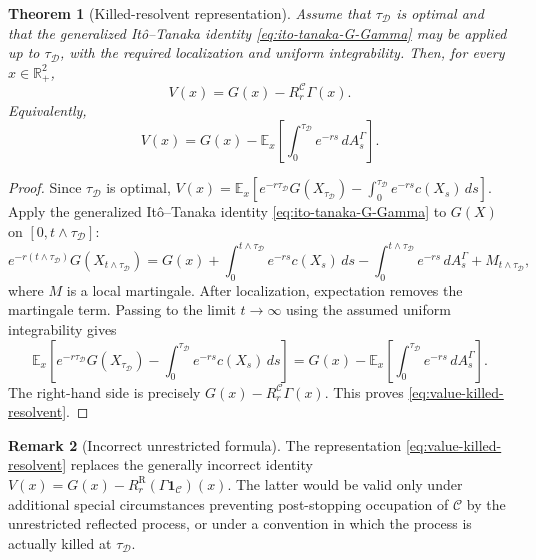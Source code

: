 \documentclass[pdflatex,sn-mathphys-num]{sn-jnl}
\theoremstyle{plain}
\newtheorem{theorem}{Theorem}[section]
\theoremstyle{definition}
\newtheorem{remark}[theorem]{Remark}
\newcommand{\R}{\mathbb{R}}
\begin{document}
\begin{theorem}[Killed-resolvent representation]
\label{thm:killed-resolvent-representation}
Assume that $\tau_{\mathcal D}$ is optimal and that the generalized
It\^o--Tanaka identity \eqref{eq:ito-tanaka-G-Gamma} may be applied up to
$\tau_{\mathcal D}$, with the required localization and uniform integrability.
Then, for every $x\in\R^2_+$,
\begin{equation}
\label{eq:value-killed-resolvent}
   V(x)=G(x)-R_r^{\mathcal C}\Gamma(x).
\end{equation}
Equivalently,
\[
   V(x)
   =
   G(x)
   -\mathbb E_x\left[
      \int_0^{\tau_{\mathcal D}}e^{-rs}\,dA_s^\Gamma
   \right].
\]
\end{theorem}
\begin{proof}
Since $\tau_{\mathcal D}$ is optimal,
$\displaystyle    V(x)
   =
   \mathbb E_x\left[
      e^{-r\tau_{\mathcal D}}G(X_{\tau_{\mathcal D}})
      -\int_0^{\tau_{\mathcal D}}e^{-rs}c(X_s)\,ds
   \right]$.
Apply the generalized It\^o--Tanaka identity \eqref{eq:ito-tanaka-G-Gamma} to
$G(X)$ on $[0,t\wedge\tau_{\mathcal D}]$:
\[
   e^{-r(t\wedge\tau_{\mathcal D})}G(X_{t\wedge\tau_{\mathcal D}})
   =
   G(x)
   +\int_0^{t\wedge\tau_{\mathcal D}}e^{-rs}c(X_s)\,ds
   -\int_0^{t\wedge\tau_{\mathcal D}}e^{-rs}\,dA_s^\Gamma
   +M_{t\wedge\tau_{\mathcal D}},
\]
where $M$ is a local martingale. After localization, expectation removes the
martingale term. Passing to the limit $t\to\infty$ using the assumed uniform
integrability gives
\[
   \mathbb E_x\left[
      e^{-r\tau_{\mathcal D}}G(X_{\tau_{\mathcal D}})
      -\int_0^{\tau_{\mathcal D}}e^{-rs}c(X_s)\,ds
   \right]
   =
   G(x)
   -\mathbb E_x\left[
      \int_0^{\tau_{\mathcal D}}e^{-rs}\,dA_s^\Gamma
   \right].
\]
The right-hand side is precisely $G(x)-R_r^{\mathcal C}\Gamma(x)$. This proves
\eqref{eq:value-killed-resolvent}.
\end{proof}

\begin{remark}[Incorrect unrestricted formula]
\label{rem:incorrect-unrestricted-formula}
The representation \eqref{eq:value-killed-resolvent} replaces the generally
incorrect identity
$V(x)=G(x)-R_r^{\mathrm R}(\Gamma\mathbf 1_{\mathcal C})(x)$. The latter would
be valid only under additional special circumstances preventing post-stopping
occupation of $\mathcal C$ by the unrestricted reflected process, or under a
convention in which the process is actually killed at $\tau_{\mathcal D}$.
\end{remark}
\end{document}
